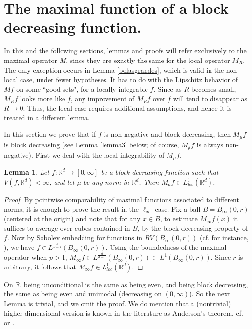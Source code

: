 \documentclass[12pt]{amsart}
\numberwithin{equation}{section}
\theoremstyle{plain}
\newtheorem{lemma}[theorem]{Lemma}
\theoremstyle{definition}
\theoremstyle{remark}
\begin{document}
\section{The maximal function of a block decreasing function.}

In this  and the following sections, lemmas and proofs
will refer exclusively to the maximal operator $M$, since they are exactly the same for the
local operator $M_R$. The only exception occurs in Lemma \ref{bolasgrandes},
which is valid in the non-local case, under fewer hypotheses.
It has to do with the Lipschitz behavior of $Mf$ on some ``good sets",
for a locally integrable $f$.
Since as $R$ becomes small, $M_R f$ looks more like $f$, any improvement
of $M_R f$ over $f$ will tend to disappear as $R\to 0$.
Thus, the local case requires additional assumptions, and hence it is treated in a different lemma.

In this section we prove  that if $f$ is non-negative and block decreasing,
then $M_\mu f$ is block decreasing (see Lemma
\ref{lemma3} below; of course, $M_\mu f$ is always non-negative). First
we deal with the local integrability of $M_\mu f$.

\begin{lemma}
  \label{locint}
  Let $f: \mathbb{R}^d \to [0,\infty]$ be a block decreasing function
   such that
  $V(f,\mathbb{R}^d)<\infty$, and let $\mu$ be any norm in $\mathbb{R}^d$. Then $M_\mu f\in L^1_{loc} (\mathbb{R}^d)$.
\end{lemma}

\begin{proof} By pointwise comparability of maximal functions
associated to different norms, it is enough to prove the
result in the $\ell_\infty$ case. Fix a ball $B = B_\infty (0, r)$ (centered at the origin) and note that for any $x\in B$, to estimate
$M_\infty f (x)$ it suffices to average over cubes contained in $B$,
by the block decreasing property of $f$. Now by Sobolev embedding
for functions in $BV (B_\infty (0, r))$
(cf. for instance, \cite[Corollary 3.49, p. 152]{AFP}), we have
$f\in L^{\frac{d}{d - 1}}(B_\infty (0, r))$. Using the boundedness
of the maximal operator when $p > 1$, $M_\infty f\in L^{\frac{d}{d - 1}}(B_\infty (0, r))\subset L^{1}(B_\infty (0, r))$. Since $r$ is arbitrary, it follows that $M_\infty f\in L^1_{loc} (\mathbb{R}^d)$.
\end{proof}

On $\mathbb{R}$, being unconditional is the same as
being even, and being block decreasing, the same as being even and unimodal (decreasing on $(0,\infty)$).
So the next Lemma is trivial, and we omit the proof. We do mention that
a (nontrivial) higher dimensional version is known in the literature as
 Anderson's theorem, cf.
 \cite{An} or \cite[Theorem 11.1]{Ga}.
\end{document}
